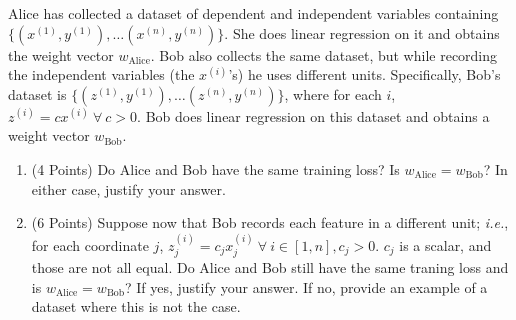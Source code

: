\documentclass{article}
\newcounter{problem}
\begin{document}
	\begin{problem}
		Alice has collected a dataset of dependent and independent variables containing \(\{(x^{(1)},y^{(1)}),\hdots(x^{(n)},y^{(n)})\}\). She does linear regression on it and obtains the weight vector \(w_\text{Alice}\). Bob also collects the same dataset, but while recording the independent variables (the \(x^{(i)}\)'s) he uses different units. Specifically, Bob's dataset is \(\{(z^{(1)},y^{(1)}),\hdots(z^{(n)},y^{(n)})\}\), where for each \(i\), \(z^{(i)}=cx^{(i)}\ \forall\ c>0\). Bob does linear regression on this dataset and obtains a weight vector \(w_\text{Bob}\).
		
		\begin{enumerate}[label=(\alph*)]
			\item (4 Points) Do Alice and Bob have the same training loss? Is \(w_\text{Alice}=w_\text{Bob}\)? In either case, justify your answer.
			
			\item (6 Points) Suppose now that Bob records each feature in a different unit; \textit{i.e.}, for each coordinate \(j\), \(z_j^{(i)}=c_jx_j^{(i)}\ \forall\ i\in[1,n],c_j>0\). \(c_j\) is a scalar, and those are not all equal. Do Alice and Bob still have the same traning loss and is \(w_\text{Alice}=w_\text{Bob}\)? If yes, justify your answer. If no, provide an example of a dataset where this is not the case.
		\end{enumerate}
	\end{problem}
\end{document}
